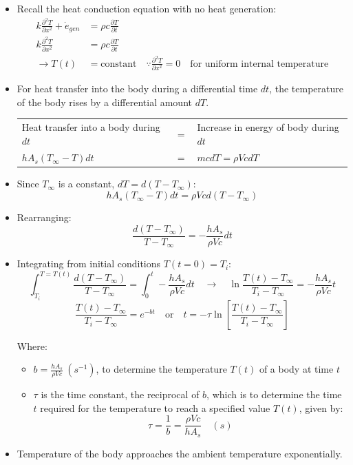 \documentclass[11pt]{article}
\begin{document}
\begin{itemize}
\item Recall the heat conduction equation with no heat generation:
\begin{align*}
k \frac{\partial^2 T}{\partial x^2} + \dot{e}_{gen} &= \rho c \frac{\partial T}{\partial t} \\
k \frac{\partial^2 T}{\partial x^2} &= \rho c \frac{\partial T}{\partial t} \\
\rightarrow T(t) &= \text{constant} \quad \because \frac{\partial^2 T}{\partial x^2} = 0 \quad \text{for uniform internal temperature}
\end{align*}

 \newpage

\item For heat transfer into the body during a differential time \(dt\), the temperature of the body rises by a differential amount \(dT\).
\begin{center}
\begin{tabular}{>{\centering\arraybackslash}m{15.5em} >{\centering\arraybackslash}m{1em} >{\centering\arraybackslash}m{17em}}
Heat transfer into a body during \(dt\) & \(=\) & Increase in energy of body during \(dt\)\\[0pt]
\(h A_s (T_{\infty} - T) dt\) & \(=\) & \(mc dT = \rho V c dT\)\\[0pt]
\end{tabular}
\end{center}
\item Since \(T_{\infty}\) is a constant, \(dT = d(T - T_{\infty})\):
\[hA_s (T_{\infty} - T) dt = \rho V c d(T - T_{\infty})\]
\item Rearranging:
\[\frac{d(T - T_{\infty})}{T - T_{\infty}} = - \frac{h A_s}{\rho V c} dt\]
\item Integrating from initial conditions \(T(t = 0) = T_i\):
\[\int_{T_i}^{T = T(t)} \frac{d(T - T_{\infty})}{T - T_{\infty}} = \int_0^t - \frac{h A_s}{\rho V c} dt \quad \rightarrow \quad \ln \frac{T(t) - T_{\infty}}{T_i - T_{\infty}} = - \frac{h A_s}{\rho V c} t\]
\[\frac{T(t) - T_{\infty}}{T_i - T_{\infty}} = e^{-bt} \quad \text{or} \quad t = - \tau \ln \left[\frac{T(t) - T_{\infty}}{T_i - T_{\infty}} \right]\]

Where:
\begin{itemize}
\item \(b = \frac{h A_s}{\rho V c} \ (\unit{s^{-1}})\), to determine the temperature \(T(t)\) of a body at time \(t\)
\item \(\tau\) is the time constant, the reciprocal of \(b\), which is to determine the time \(t\) required for the temperature to reach a specified value \(T(t)\), given by:
\[\tau = \frac{1}{b} = \frac{\rho V c}{h A_s} \quad (\unit{s})\]
\end{itemize}

 \newpage

\item Temperature of the body approaches the ambient temperature exponentially.
\end{itemize}
\end{document}
